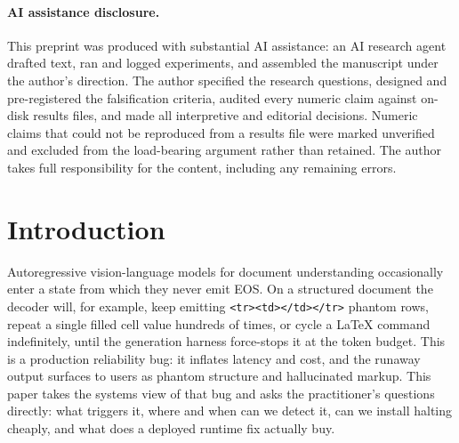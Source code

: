 \documentclass[11pt]{article}
\begin{document}
\begin{abstract}
it cuts mean runaway length 37.68\% with 0 of 10 control false-positives but still leaves
5 of 13 positives at the cap; at a $+30$ boost it reaches 99.58\% reduction but at 10 of 10
control false-positives. Grey-noise image inpainting collapses all 5 of 5 named positives
to short EOS halts, motivating a vision-aware guardrail. The representational geometry that
explains \emph{why} these per-class halt signals are organized the way they are (per-class
halt directions, a two-family bifurcation, count-manifold structure, and a
fine-tune signature) is treated in a companion representational-geometry paper; here we keep
only the minimal mechanistic facts a practitioner needs to justify the monitor.
\end{abstract}

\paragraph{AI assistance disclosure.}
This preprint was produced with substantial AI assistance: an AI research agent
drafted text, ran and logged experiments, and assembled the manuscript under the
author's direction. The author specified the research questions, designed and
pre-registered the falsification criteria, audited every numeric claim against
on-disk results files, and made all interpretive and editorial decisions. Numeric
claims that could not be reproduced from a results file were marked unverified and
excluded from the load-bearing argument rather than retained. The author takes full
responsibility for the content, including any remaining errors.

\section{Introduction}

Autoregressive vision-language models for document understanding occasionally enter a
state from which they never emit EOS. On a structured document the decoder will, for
example, keep emitting \texttt{<tr><td></td></tr>} phantom rows, repeat a single filled
cell value hundreds of times, or cycle a LaTeX command indefinitely, until the
generation harness force-stops it at the token budget. This is a production reliability
bug: it inflates latency and cost, and the runaway output surfaces to users as phantom
structure and hallucinated markup. This paper takes the systems view of that bug and asks
the practitioner's questions directly: what triggers it, where and when can we detect it,
can we install halting cheaply, and what does a deployed runtime fix actually buy.
\end{document}
